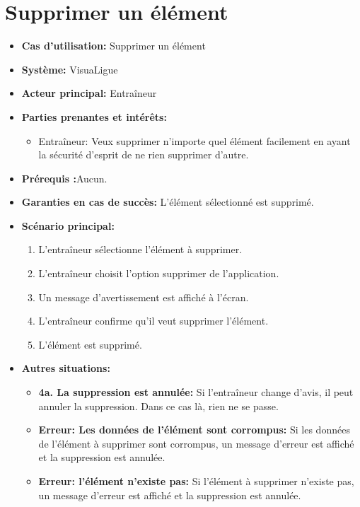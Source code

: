 \section{Supprimer un \'el\'ement}
\label{sec:supprimer_un_'el'ement}

\begin{itemize}
    \item \textbf{Cas d'utilisation:} Supprimer un \'el\'ement
    \item \textbf{Syst\`eme:} VisuaLigue
    \item \textbf{Acteur principal:} Entra\^ineur
    \item \textbf{Parties prenantes et int\'er\^ets:}
        \begin{itemize}
            \item Entraîneur: Veux supprimer n'importe quel élément facilement en ayant la sécurité d'esprit de ne rien supprimer d'autre.
        \end{itemize}
    \item \textbf{Pr\'erequis :}Aucun.
    \item \textbf{Garanties en cas de succ\`es:} L'élément sélectionné est supprimé.
    \item \textbf{Sc\'enario principal:}
        \begin{enumerate}
            \item L'entraîneur sélectionne l'élément à supprimer.
            \item L'entraîneur choisit l'option supprimer de l'application.
            \item Un message d'avertissement est affiché à l'écran.
            \item L'entraîneur confirme qu'il veut supprimer l'\'el\'ement.
            \item L'\'el\'ement est supprim\'e.
        \end{enumerate}
    \item \textbf{Autres situations:}
        \begin{itemize}
            \item \textbf{4a. La suppression est annul\'ee:} Si l'entraîneur change d'avis, il peut annuler la suppression. Dans ce cas l\`a, rien ne se passe.
            \item \textbf{Erreur: Les donn\'ees de l'\'el\'ement sont corrompus:} Si les donn\'ees de l'\'el\'ement \`a supprimer sont corrompus, un message d'erreur est affich\'e et la suppression est annul\'ee.
            \item \textbf{Erreur: l'\'el\'ement n'existe pas:} Si l'\'el\'ement \`a supprimer n'existe pas, un message d'erreur est affich\'e et la suppression est annul\'ee.

\end{itemize}
\end{itemize}
